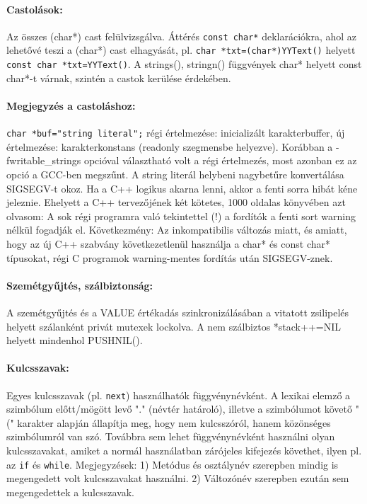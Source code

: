 \begin{description}
  \paragraph{Castolások:}
    Az összes (char*) cast felülvizsgálva.
    Áttérés \verb!const char*! deklarációkra, ahol az lehetővé teszi 
    a  (char*) cast elhagyását, pl. \verb!char *txt=(char*)YYText()! 
    helyett   \verb!const char *txt=YYText()!.
    A strings(), stringn() függvények char* helyett const char*-t 
    várnak, szintén a castok kerülése érdekében.
    
  \paragraph{Megjegyzés a castoláshoz:}
        \verb!char *buf="string literal";!
    régi értelmezése: inicializált karakterbuffer,
    új értelmezése: karakterkonstans (readonly szegmensbe helyezve).
    Korábban a -fwritable\_strings opcióval választható volt
    a régi értelmezés, most azonban ez az opció a GCC-ben megszűnt.
    A string literál helybeni nagybetűre konvertálása SIGSEGV-t okoz.
    Ha a C++ logikus akarna lenni, akkor a fenti sorra hibát kéne
    jeleznie. Ehelyett a C++ tervezőjének két kötetes,  1000 oldalas 
    könyvében azt olvasom: A sok régi programra való tekintettel (!) 
    a fordítók a fenti sort warning nélkül fogadják el. Következmény:
    Az inkompatibilis változás miatt, és amiatt, hogy az új C++ szabvány 
    következetlenül használja a char* és const char*  típusokat, régi 
    C programok warning-mentes fordítás után SIGSEGV-znek.
    
  \paragraph{Szemétgyűjtés, szálbiztonság:}
    A szemétgyűjtés és a VALUE értékadás szinkronizálásában
    a vitatott zsilipelés helyett szálanként privát mutexek lockolva.
    A nem szálbiztos *stack++=NIL helyett mindenhol PUSHNIL().
    
  \paragraph{Kulcsszavak:}  
    Egyes kulcsszavak (pl. \verb!next!) használhatók függvénynévként.
    A lexikai elemző a szimbólum előtt/mögött levő "." 
    (névtér határoló), illetve a szimbólumot követő "("
    karakter alapján állapítja meg, hogy nem kulcsszóról,
    hanem közönséges szimbólumról van szó. Továbbra sem
    lehet függvénynévként használni olyan kulcsszavakat,
    amiket a normál használatban zárójeles kifejezés
    követhet, ilyen pl. az \verb!if! és \verb!while!.
    Megjegyzések: 1) Metódus és osztálynév szerepben mindig is
    megengedett volt kulcsszavakat használni. 2) Változónév
    szerepben ezután sem megengedettek a kulcsszavak.


\end{description}
